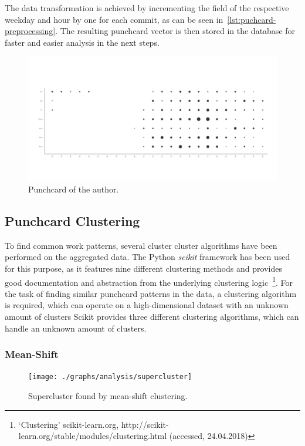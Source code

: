 The data transformation is achieved by incrementing the field of the respective weekday and hour by one for each commit, as can be seen in~\ref{lst:puchcard-preprocessing}.
The resulting punchcard vector is then stored in the database for faster and easier analysis in the next steps.

\begin{figure}[H]
    \includegraphics[scale=0.32]{./graphs/analysis/ordered-punchcard}
    \centering
    \caption{Punchcard of the author.}\label{fig:working-hour-rhythm-author}
\end{figure}



\subsection{Punchcard Clustering}

To find common work patterns, several cluster cluster algorithms have been performed on the aggregated data.
The Python \emph{scikit} framework has been used for this purpose, as it features nine different clustering methods and provides good documentation and abstraction from the underlying clustering logic~\footnote{`Clustering' scikit-learn.org, http://scikit-learn.org/stable/modules/clustering.html (accessed, 24.04.2018)}.
For the task of finding similar punchcard patterns in the data, a clustering algorithm is required, which can operate on a high-dimensional dataset with an unknown amount of clusters
Scikit provides three different clustering algorithms, which can handle an unknown amount of clusters.

\subsubsection{Mean-Shift}

\begin{figure}[H]
    \texttt{[image: ./graphs/analysis/supercluster]}
    \centering
    \caption{Supercluster found by mean-shift clustering.}\label{fig:working-hour-rhythm-author}
\end{figure}



